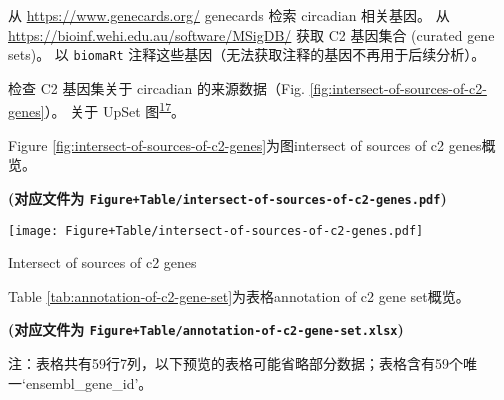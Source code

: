\documentclass[
]{article}
\begin{document}
从 \url{https://www.genecards.org/} genecards 检索 circadian 相关基因。
从 \url{https://bioinf.wehi.edu.au/software/MSigDB/} 获取 C2 基因集合 (curated gene sets)。
以 \texttt{biomaRt} 注释这些基因（无法获取注释的基因不再用于后续分析）。

检查 C2 基因集关于 circadian 的来源数据（Fig. \ref{fig:intersect-of-sources-of-c2-genes}）。
关于 UpSet 图\textsuperscript{\protect\hyperlink{ref-SetsAndIntersLexA2014}{17}}。

Figure \ref{fig:intersect-of-sources-of-c2-genes}为图intersect of sources of c2 genes概览。

\textbf{(对应文件为 \texttt{Figure+Table/intersect-of-sources-of-c2-genes.pdf})}

\def\@captype{figure}
\begin{center}
\texttt{[image: Figure+Table/intersect-of-sources-of-c2-genes.pdf]}
\caption{Intersect of sources of c2 genes}\label{fig:intersect-of-sources-of-c2-genes}
\end{center}

Table \ref{tab:annotation-of-c2-gene-set}为表格annotation of c2 gene set概览。

\textbf{(对应文件为 \texttt{Figure+Table/annotation-of-c2-gene-set.xlsx})}

\begin{center}\begin{tcolorbox}[colback=gray!10, colframe=gray!50, width=0.9\linewidth, arc=1mm, boxrule=0.5pt]注：表格共有59行7列，以下预览的表格可能省略部分数据；表格含有59个唯一`ensembl\_gene\_id'。
\end{tcolorbox}
\end{center}
\end{document}
